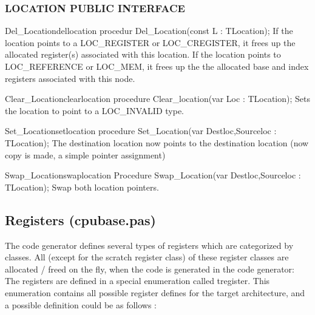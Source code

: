 \documentclass [12pt]{article}
\begin{document}
\subsubsection{LOCATION PUBLIC INTERFACE}
\label{subsubsec:location}

\begin{procedurel}{Del{\_}Location}{dellocation}
\Declaration
procedur Del{\_}Location(const L : TLocation);
\Description
If the location points to a LOC{\_}REGISTER or LOC{\_}CREGISTER, it frees up
the allocated register(s) associated with this location. If the location
points to LOC{\_}REFERENCE or LOC{\_}MEM, it frees up the the allocated base
and index registers associated with this node. 
\end{procedurel}

\begin{procedurel}{Clear{\_}Location}{clearlocation}
\Declaration
procedure Clear{\_}location(var Loc : TLocation);
\Description
Sets the location to point to a LOC{\_}INVALID type. 
\end{procedurel}

\begin{procedurel}{Set{\_}Location}{setlocation}
\Declaration
procedure Set{\_}Location(var Destloc,Sourceloc : TLocation);
\Description
The destination location now points to the destination location (now copy is
made, a simple pointer assignment) 
\end{procedurel}

\begin{procedurel}{Swap{\_}Location}{swaplocation}
\Declaration
Procedure Swap{\_}Location(var Destloc,Sourceloc : TLocation);
\Description
Swap both location pointers. 
\end{procedurel}

\subsection{Registers (cpubase.pas)}
\label{subsec:registers}

The code generator defines several types of registers which are categorized 
by classes. All (except for the scratch register class) of these register 
classes are allocated / freed on the fly, when the code is generated in the 
code generator: The registers are defined in a special enumeration called 
tregister. This enumeration contains all possible register defines for the 
target architecture, and a possible definition could be as follows :

\end{document}
